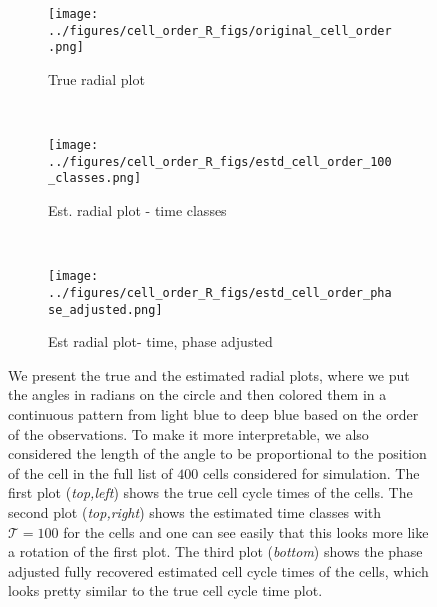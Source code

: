 \documentclass[11pt]{article}
\begin{document}
\begin{figure*}[ht]
    \centering
     \begin{subfigure}[t]{0.5\textwidth}
        \centering
        \texttt{[image: ../figures/cell\_order\_R\_figs/original\_cell\_order.png]}
        \caption{True radial plot}
    \end{subfigure}%
    ~
    \begin{subfigure}[t]{0.5\textwidth}
        \centering
        \texttt{[image: ../figures/cell\_order\_R\_figs/estd\_cell\_order\_100\_classes.png]}
        \caption{Est. radial plot - time classes}
    \end{subfigure}\\

     \begin{subfigure}[t]{0.5\textwidth}
        \centering
        \texttt{[image: ../figures/cell\_order\_R\_figs/estd\_cell\_order\_phase\_adjusted.png]}
        \caption{Est radial plot- time, phase adjusted}
    \end{subfigure}
    \caption{We present the true and the estimated radial plots, where we put the angles in radians on the circle and then colored them in a continuous pattern from light blue  to deep blue based on the order of the observations. To make it more interpretable, we also considered the length of the angle to be proportional to the position of the cell in the full list of $400$ cells considered for simulation. The first plot (\textit{top,left}) shows the true cell cycle times of the cells. The second plot (\textit{top,right}) shows the estimated time classes with $\mathcal{T}=100$ for the cells and one can see easily that this looks more like a rotation of the first plot. The third plot (\textit{bottom}) shows the phase adjusted fully recovered estimated cell cycle times of the cells, which looks pretty similar to the true cell cycle time plot.}
 \label{fig:fig2}
 \end{figure*}
\end{document}
